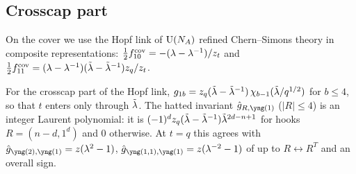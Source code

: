 \subsection{Crosscap part}
On the cover we use the Hopf link of $\mathrm{U}(N_A)$ refined Chern--Simons theory in composite representations: $\tfrac12 f^{\mathrm{cov}}_{10} = -(\lambda - \lambda^{-1})/z_t$ and $\tfrac12 f^{\mathrm{cov}}_{11} = (\lambda - \lambda^{-1})(\tilde\lambda - \tilde\lambda^{-1})z_q/z_t$.
\begin{result}\label{cr:hopfg}
For the crosscap part of the Hopf link, $g_{1b} = z_q(\tilde\lambda - \tilde\lambda^{-1})\,\chi_{b-1}(\tilde\lambda/q^{1/2})$ for $b \le 4$, so that $t$ enters only through $\tilde\lambda$. The hatted invariant $\hat g_{R,\yone}$ ($|R| \le 4$) is an integer Laurent polynomial: it is $(-1)^d z_q(\tilde\lambda - \tilde\lambda^{-1})\tilde\lambda^{2d-n+1}$ for hooks $R = (n-d, 1^d)$ and $0$ otherwise. At $t = q$ this agrees with $\hat g_{\ytwo,\yone} = z(\lambda^2 - 1)$, $\hat g_{\yoneone,\yone} = z(\lambda^{-2} - 1)$ of \cite{Marino09} up to $R \leftrightarrow R^T$ and an overall sign.
\end{result}

